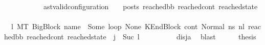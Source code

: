 \begin{isabellebody}
\ \ \isamarkupfalse%
\ \isanewline
\ \ \ \ \isamarkupfalse%
\ {\isachardoublequoteopen}{\isasymnot}\ {\isacharparenleft}{\kern0pt}{\isacharparenleft}{\kern0pt}ast{\isacharunderscore}{\kern0pt}valid{\isacharunderscore}{\kern0pt}configuration\ {\isasymLambda}\ {\isasymGamma}\ {\isasymOmega}\ posts\ reached{\isacharunderscore}{\kern0pt}bb\ reached{\isacharunderscore}{\kern0pt}cont\ reached{\isacharunderscore}{\kern0pt}state{\isacharparenright}{\kern0pt}{\isacharparenright}{\kern0pt}{\isachardoublequoteclose}\isanewline
\ \ \ \ \isamarkupfalse%
\ {\isachardoublequoteopen}{\isacharparenleft}{\kern0pt}{\isasymexists}\ l{}{\isachardot}{\kern0pt}\ {\isacharparenleft}{\kern0pt}M{\isacharcomma}{\kern0pt}{\isasymLambda}{\isacharcomma}{\kern0pt}{\isasymGamma}{\isacharcomma}{\kern0pt}{\isasymOmega}{\isacharcomma}{\kern0pt}T\ {\isasymturnstile}{\isacharparenleft}{\kern0pt}BigBlock\ name\ {\isacharbrackleft}{\kern0pt}{\isacharbrackright}{\kern0pt}\ {\isacharparenleft}{\kern0pt}Some\ loop{\isacharparenright}{\kern0pt}\ None{\isacharcomma}{\kern0pt}\ KEndBlock\ cont{}{\isacharcomma}{\kern0pt}\ Normal\ ns{}{\isacharprime}{\kern0pt}{\isacharprime}{\kern0pt}{\isacharparenright}{\kern0pt}\ {\isacharminus}{\kern0pt}n{\isasymlongrightarrow}{\isacharcircum}{\kern0pt}l{}\ {\isacharparenleft}{\kern0pt}reached{\isacharunderscore}{\kern0pt}bb{\isacharcomma}{\kern0pt}\ reached{\isacharunderscore}{\kern0pt}cont{\isacharcomma}{\kern0pt}\ reached{\isacharunderscore}{\kern0pt}state{\isacharparenright}{\kern0pt}{\isacharparenright}{\kern0pt}\ {\isasymand}\ {\isacharparenleft}{\kern0pt}j\ {\isacharequal}{\kern0pt}\ Suc\ l{}{\isacharparenright}{\kern0pt}\ {\isacharparenright}{\kern0pt}{\isachardoublequoteclose}\ \isanewline
\ \ \ \ \ \ \isamarkupfalse%
\ disj{\isacharunderscore}{\kern0pt}a\ \isamarkupfalse%
\ blast\isanewline
\ \ \ \ \isamarkupfalse%
\ {\isacharquery}{\kern0pt}thesis\isanewline
\ \ \ \ \isamarkupfalse%
\ {\isacharminus}{\kern0pt}\isanewline
\ \ \ \ \ \ \isamarkupfalse%

\end{isabellebody}
